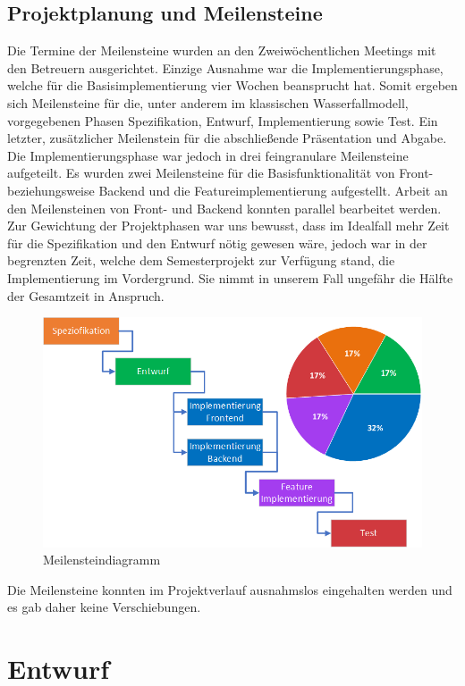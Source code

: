 \subsection{Projektplanung und Meilensteine}
Die Termine der Meilensteine wurden an den Zweiwöchentlichen Meetings mit den Betreuern ausgerichtet. Einzige Ausnahme war die Implementierungsphase, welche für die Basisimplementierung vier Wochen beansprucht hat. Somit ergeben sich Meilensteine für die, unter anderem im klassischen Wasserfallmodell, vorgegebenen Phasen Spezifikation, Entwurf, Implementierung sowie Test. Ein letzter, zusätzlicher Meilenstein für die abschließende Präsentation und Abgabe. Die Implementierungsphase war jedoch in  drei feingranulare Meilensteine aufgeteilt. Es wurden zwei Meilensteine für die Basisfunktionalität von Front- beziehungsweise Backend und die Featureimplementierung aufgestellt. Arbeit an den Meilensteinen von Front- und Backend konnten parallel bearbeitet werden. Zur Gewichtung der Projektphasen war uns bewusst, dass im Idealfall mehr Zeit für die Spezifikation und den Entwurf nötig gewesen wäre, jedoch war in der begrenzten Zeit, welche dem Semesterprojekt zur Verfügung stand, die Implementierung im Vordergrund. Sie nimmt in unserem Fall ungefähr die Hälfte der Gesamtzeit in Anspruch.
\newpage
\begin{figure}[h]
	\centering
	\includegraphics[width=\textwidth]{content/pictures/Phasen_Diagramm.png}
	\caption{Meilensteindiagramm}
	\label{img:milestone}
\end{figure}

Die Meilensteine konnten im Projektverlauf ausnahmslos eingehalten werden und es gab daher keine Verschiebungen.

\section{Entwurf}
